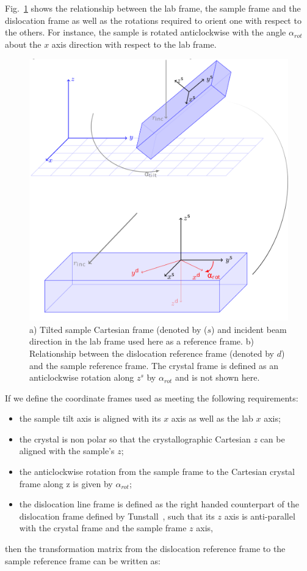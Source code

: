 Fig.~\ref{fig:sampleframe} shows the relationship between the lab frame, the sample frame and the dislocation frame as well as the rotations required to orient one with respect to the others. For instance, the sample is rotated anticlockwise with the angle $\alpha_{rot}$ about the $x$ axis direction with respect to the lab frame.

\begin{figure}[ht]
    \centering
    \includegraphics[width=0.78\linewidth]{Figures/calculus.png}
    \caption[Forward geometry reference frames.]{a) Tilted sample Cartesian frame (denoted by ($s$) and incident beam direction in the lab frame used here as a reference frame. b) Relationship between the dislocation reference frame (denoted by $d$) and the sample reference frame. The crystal frame is defined as an anticlockwise rotation along $z^s$ by $\alpha_{rot}$ and is not shown here.}
    \label{fig:sampleframe}
\end{figure}

If we define the coordinate frames used as meeting the following requirements:
\begin{itemize}
    \item the sample tilt axis is aligned with its $x$ axis as well as the lab $x$ axis;
    \item the crystal is non polar so that the crystallographic Cartesian $z$ can be aligned with the sample's $z$;
    \item the anticlockwise rotation from the sample frame to the Cartesian crystal frame along z is given by $\alpha_{rot}$;
    \item the dislocation line frame is defined as the right handed counterpart of the dislocation frame defined by
Tunstall~\cite{Tunstall64}, such that its $z$ axis is anti-parallel with the crystal frame and the sample frame $z$ axis,
\end{itemize}
then the transformation matrix from the dislocation reference frame to the sample reference frame can be written as:

